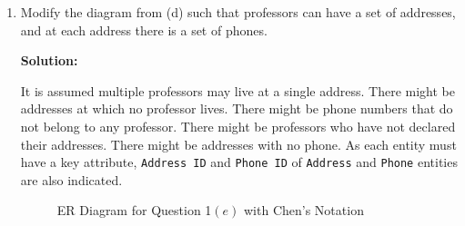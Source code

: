 \begin{enumerate}[label=(\alph*)]
\item Modify the diagram from (d) such that professors can have a set of addresses, and at each address there is a set of phones.

\textbf{Solution:}

It is assumed multiple professors may live at a single address.
There might be addresses at which no professor lives.
There might be phone numbers that do not belong to any professor.
There might be professors who have not declared their addresses.
There might be addresses with no phone.
As each entity must have a key attribute, \texttt{Address ID} and \texttt{Phone ID} of \texttt{Address} and \texttt{Phone} entities are also indicated.

\begin{figure}[H]\centering

\caption{ER Diagram for Question 1$\left(e\right)$ with Chen's Notation} \label{fig:ER5}
\end{figure}

\end{enumerate}
